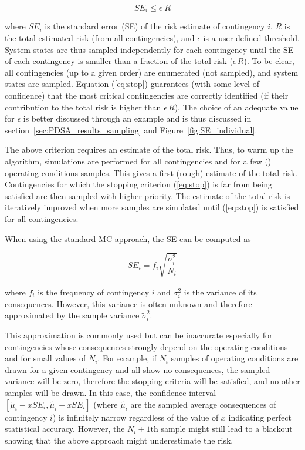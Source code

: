 \begin{equation}
  \label{eq:stop}
  SE_i \leq \epsilon \; R
\end{equation}

\noindent where \(SE_i\) is the standard error (SE) of the risk estimate of contingency \(i\), \(R\) is the total estimated risk (from all contingencies), and \(\epsilon\) is a user-defined threshold. System states are thus sampled independently for each contingency until the SE of each contingency is smaller than a fraction of the total risk (\(\epsilon \, R\)). To be clear, all contingencies (up to a given order) are enumerated (not sampled), and system states are sampled. Equation (\ref{eq:stop}) guarantees (with some level of confidence) that the most critical contingencies are correctly identified (if their contribution to the total risk is higher than \(\epsilon \, R\)). The choice of an adequate value for \(\epsilon\) is better discussed through an example and is thus discussed in section~\ref{sec:PDSA_results_sampling} and Figure~\ref{fig:SE_individual}.

The above criterion requires an estimate of the total risk. Thus, to warm up the algorithm, simulations are performed for all contingencies and for a few () operating conditions samples. This gives a first (rough) estimate of the total risk. Contingencies for which the stopping criterion (\ref{eq:stop}) is far from being satisfied are then sampled with higher priority. The estimate of the total risk is iteratively improved when more samples are simulated until (\ref{eq:stop}) is satisfied for all contingencies.

When using the standard MC approach, the SE can be computed as

\begin{equation}
  \label{eq:SE_classic}
  SE_i = f_i \sqrt{\frac{\sigma_i^2}{N_i}}
\end{equation}

\noindent where \(f_i\) is the frequency of contingency \(i\) and \(\sigma_i^2\) is the variance of its consequences. However, this variance is often unknown and therefore approximated by the sample variance \(\tilde{\sigma}_i^2\).

This approximation is commonly used but can be inaccurate especially for contingencies whose consequences strongly depend on the operating conditions and for small values of \(N_i\). For example, if \(N_i\) samples of operating conditions are drawn for a given contingency and all show no consequences, the sampled variance will be zero, therefore the stopping criteria will be satisfied, and no other samples will be drawn. In this case, the confidence interval \([\tilde{\mu_i} - x SE_i, \tilde{\mu_i} + x SE_i]\) (where \(\tilde{\mu_i}\) are the sampled average consequences of contingency \(i\)) is infinitely narrow regardless of the value of \(x\) indicating perfect statistical accuracy. However, the \(N_i+1\)th sample might still lead to a blackout showing that the above approach might underestimate the risk.

